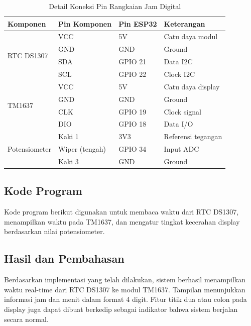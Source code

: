 \documentclass[12pt,a4paper]{article}
\begin{document}
\begin{table}[H]
    \centering
    \caption{Detail Koneksi Pin Rangkaian Jam Digital}
    \label{tab:wiring-clock}
    \begin{tabular}{|l|l|l|l|}
        \hline
        \textbf{Komponen} & \textbf{Pin Komponen} & \textbf{Pin ESP32} & \textbf{Keterangan} \\
        \hline
        \multirow{4}{*}{RTC DS1307} & VCC & 5V & Catu daya modul \\
         & GND & GND & Ground \\
         & SDA & GPIO 21 & Data I2C \\
         & SCL & GPIO 22 & Clock I2C \\
        \hline
        \multirow{4}{*}{TM1637} & VCC & 5V & Catu daya display \\
         & GND & GND & Ground \\
         & CLK & GPIO 19 & Clock signal \\
         & DIO & GPIO 18 & Data I/O \\
        \hline
        \multirow{3}{*}{Potensiometer} & Kaki 1 & 3V3 & Referensi tegangan \\
         & Wiper (tengah) & GPIO 34 & Input ADC \\
         & Kaki 3 & GND & Ground \\
        \hline
    \end{tabular}
\end{table}

\subsection{Kode Program}
Kode program berikut digunakan untuk membaca waktu dari RTC DS1307, menampilkan waktu pada TM1637, dan mengatur tingkat kecerahan display berdasarkan nilai potensiometer.



\subsection{Hasil dan Pembahasan}
Berdasarkan implementasi yang telah dilakukan, sistem berhasil menampilkan waktu real-time dari RTC DS1307 ke modul TM1637. Tampilan menunjukkan informasi jam dan menit dalam format 4 digit. Fitur titik dua atau colon pada display juga dapat dibuat berkedip sebagai indikator bahwa sistem berjalan secara normal.
\end{document}
